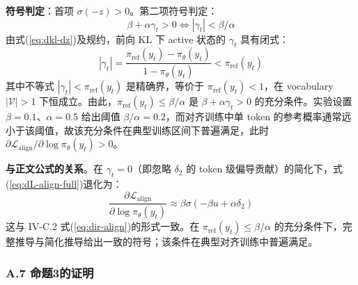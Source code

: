 \documentclass[lettersize,journal]{IEEEtran}
\begin{document}
\textbf{符号判定}：首项 $\sigma(-z) > 0$。第二项符号判定：
\begin{equation}
\beta + \alpha\gamma_t > 0 \iff |\gamma_t| < \beta/\alpha
\end{equation}
由式(\ref{eq:dkl-dz})及规约，前向 KL 下 active 状态的 $\gamma_t$ 具有闭式：
\begin{equation}
|\gamma_t| = \frac{\pi_{\text{ref}}(y_t) - \pi_\theta(y_t)}{1 - \pi_\theta(y_t)} < \pi_{\text{ref}}(y_t)
\end{equation}
其中不等式 $|\gamma_t| < \pi_{\text{ref}}(y_t)$ 是精确界，等价于 $\pi_{\text{ref}}(y_t) < 1$，在 vocabulary $|\mathcal{V}| > 1$ 下恒成立。由此，$\pi_{\text{ref}}(y_t) \leq \beta/\alpha$ 是 $\beta + \alpha\gamma_t > 0$ 的充分条件。实验设置 $\beta=0.1$、$\alpha=0.5$ 给出阈值 $\beta/\alpha = 0.2$，而对齐训练中单 token 的参考概率通常远小于该阈值，故该充分条件在典型训练区间下普遍满足，此时 $\partial \mathcal{L}_{\text{align}}/\partial \log\pi_\theta(y_t) > 0$。

\textbf{与正文公式的关系}。在 $\gamma_t = 0$（即忽略 $\delta_2$ 的 token 级偏导贡献）的简化下，式(\ref{eq:dL-align-full})退化为：
\begin{equation}
\frac{\partial \mathcal{L}_{\text{align}}}{\partial \log\pi_\theta(y_t)} \approx \beta\sigma(-\beta u + \alpha\delta_2)
\end{equation}
这与 IV-C.2 式(\ref{eq:dir-align})的形式一致。在 $\pi_{\text{ref}}(y_t) \leq \beta/\alpha$ 的充分条件下，完整推导与简化推导给出一致的符号；该条件在典型对齐训练中普遍满足。

\subsubsection*{A.7 命题3的证明}\label{app:conflict}
\end{document}
